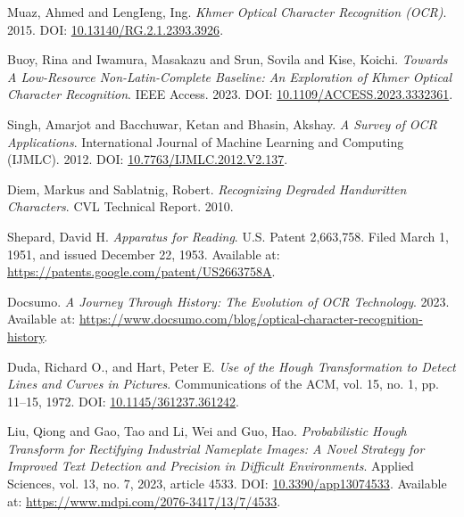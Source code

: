 \label{ch:references}

\begin{thebibliography}{99}

Muaz, Ahmed and LengIeng, Ing. 
\textit{Khmer Optical Character Recognition (OCR)}. 
2015. 
DOI: \href{https://doi.org/10.13140/RG.2.1.2393.3926}{10.13140/RG.2.1.2393.3926}.

Buoy, Rina and Iwamura, Masakazu and Srun, Sovila and Kise, Koichi.
\textit{Towards A Low-Resource Non-Latin-Complete Baseline: An Exploration of Khmer Optical Character Recognition}.
IEEE Access.
2023.
DOI: \href{https://doi.org/10.1109/ACCESS.2023.3332361}{10.1109/ACCESS.2023.3332361}.

Singh, Amarjot and Bacchuwar, Ketan and Bhasin, Akshay.
\textit{A Survey of OCR Applications}.
International Journal of Machine Learning and Computing (IJMLC).
2012.
DOI: \href{https://doi.org/10.7763/IJMLC.2012.V2.137}{10.7763/IJMLC.2012.V2.137}.

Diem, Markus and Sablatnig, Robert.
\textit{Recognizing Degraded Handwritten Characters}.
CVL Technical Report.
2010.

Shepard, David H.
\textit{Apparatus for Reading}.
U.S. Patent 2,663,758. Filed March 1, 1951, and issued December 22, 1953.
Available at: \href{https://patents.google.com/patent/US2663758A}{https://patents.google.com/patent/US2663758A}.

Docsumo.
\textit{A Journey Through History: The Evolution of OCR Technology}.
2023.
Available at: \href{https://www.docsumo.com/blog/optical-character-recognition-history}{https://www.docsumo.com/blog/optical-character-recognition-history}.

Duda, Richard O., and Hart, Peter E.
\textit{Use of the Hough Transformation to Detect Lines and Curves in Pictures}.
Communications of the ACM, vol. 15, no. 1, pp. 11–15, 1972.
DOI: \href{https://doi.org/10.1145/361237.361242}{10.1145/361237.361242}.


Liu, Qiong and Gao, Tao and Li, Wei and Guo, Hao.
\textit{Probabilistic Hough Transform for Rectifying Industrial Nameplate Images: A Novel Strategy for Improved Text Detection and Precision in Difficult Environments}.
Applied Sciences, vol. 13, no. 7, 2023, article 4533.
DOI: \href{https://doi.org/10.3390/app13074533}{10.3390/app13074533}.
Available at: \href{https://www.mdpi.com/2076-3417/13/7/4533}{https://www.mdpi.com/2076-3417/13/7/4533}.



\end{thebibliography}

